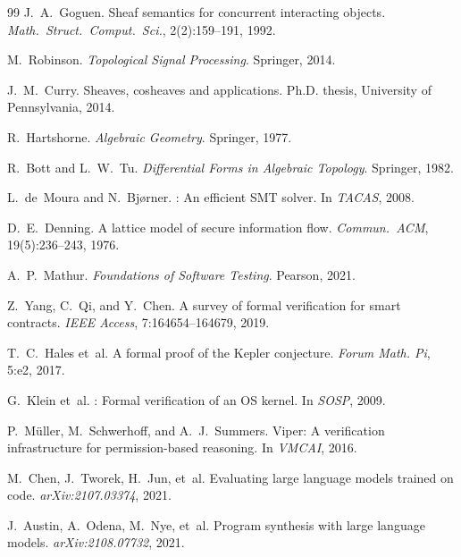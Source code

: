 \documentclass[11pt]{article}
\begin{document}
\begin{thebibliography}{99}
J.~A.~Goguen.
\newblock Sheaf semantics for concurrent interacting objects.
\newblock \emph{Math.~Struct.~Comput.~Sci.}, 2(2):159--191, 1992.

M.~Robinson.
\newblock \emph{Topological Signal Processing}.
\newblock Springer, 2014.

J.~M.~Curry.
\newblock Sheaves, cosheaves and applications.
\newblock Ph.D. thesis, University of Pennsylvania, 2014.

R.~Hartshorne.
\newblock \emph{Algebraic Geometry}.
\newblock Springer, 1977.

R.~Bott and L.~W.~Tu.
\newblock \emph{Differential Forms in Algebraic Topology}.
\newblock Springer, 1982.

L.~de~Moura and N.~Bj{\o}rner.
: An efficient {SMT} solver.
\newblock In \emph{TACAS}, 2008.

D.~E.~Denning.
\newblock A lattice model of secure information flow.
\newblock \emph{Commun.~ACM}, 19(5):236--243, 1976.

A.~P.~Mathur.
\newblock \emph{Foundations of Software Testing}.
\newblock Pearson, 2021.

Z.~Yang, C.~Qi, and Y.~Chen.
\newblock A survey of formal verification for smart contracts.
\newblock \emph{IEEE Access}, 7:164654--164679, 2019.

T.~C.~Hales et~al.
\newblock A formal proof of the {K}epler conjecture.
\newblock \emph{Forum Math. Pi}, 5:e2, 2017.

G.~Klein et~al.
: Formal verification of an {OS} kernel.
\newblock In \emph{SOSP}, 2009.

P.~M{\"u}ller, M.~Schwerhoff, and A.~J.~Summers.
\newblock Viper: A verification infrastructure for permission-based reasoning.
\newblock In \emph{VMCAI}, 2016.

M.~Chen, J.~Tworek, H.~Jun, et~al.
\newblock Evaluating large language models trained on code.
\newblock \emph{arXiv:2107.03374}, 2021.

J.~Austin, A.~Odena, M.~Nye, et~al.
\newblock Program synthesis with large language models.
\newblock \emph{arXiv:2108.07732}, 2021.


\end{thebibliography}
\end{document}
